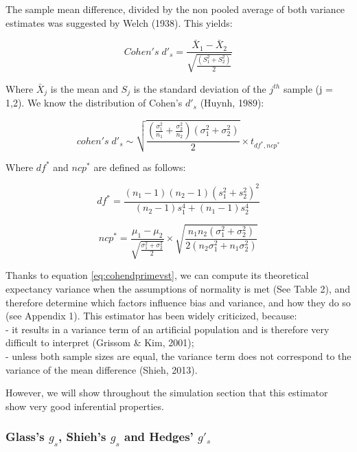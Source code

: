 \documentclass[
  man,floatsintext]{apa6}
\begin{document}
The sample mean difference, divided by the non pooled average of both variance estimates was suggested by Welch (1938). This yields:

\begin{equation} 
Cohen's \; d'_s = \frac{\bar{X}_{1} - \bar{X}_{2}}{ \sqrt{\frac{\left(S^2_{1}+S^2_{2} \right)}{2}}}
\label{eq:cohenprimeds}
\end{equation}

Where \(\bar{X}_{j}\) is the mean and \(S_j\) is the standard deviation of the \(j^{th}\) sample (j = 1,2). We know the distribution of Cohen's \(d'_{s}\) (Huynh, 1989):

\begin{equation} 
cohen's \; d'_s \sim  \sqrt{\frac{\left( \frac{\sigma^2_1}{n_1}+\frac{\sigma^2_2}{n_2}\right)(\sigma^2_1+\sigma^2_2)}{2}} \times t_{df^*,ncp^*}
\label{eq:cohendprimedist}
\end{equation}

Where \(df^*\) and \(ncp^*\) are defined as follows:

\begin{equation} 
df^* = \frac{(n_1-1)(n_2-1)(s^2_1+s^2_2)^2}{(n_2-1)s^4_1+(n_1-1)s^4_2}
\label{eq:cohendprimedf}
\end{equation}

\begin{equation} 
ncp^*=\frac{\mu_1-\mu_2}{\sqrt{\frac{\sigma^2_1+\sigma^2_2}{2}}} \times \sqrt{\frac{n_1n_2(\sigma^2_1+\sigma^2_2)}{2(n_2\sigma^2_1+n_1\sigma^2_2)}}
\label{eq:cohendprimevst}
\end{equation}

Thanks to equation \ref{eq:cohendprimevst}, we can compute its theoretical expectancy variance when the assumptions of normality is met (See Table 2), and therefore determine which factors influence bias and variance, and how they do so (see Appendix 1). This estimator has been widely criticized, because:\\
- it results in a variance term of an artificial population and is therefore very difficult to interpret (Grissom \& Kim, 2001);\\
- unless both sample sizes are equal, the variance term does not correspond to the variance of the mean difference (Shieh, 2013).

However, we will show throughout the simulation section that this estimator show very good inferential properties.

\hypertarget{glasss-g_s-shiehs-g_s-and-hedges-g_s}{%
\subsubsection{\texorpdfstring{Glass's \(g_s\), Shieh's \(g_s\) and Hedges' \(g'_s\)}{Glass's g\_s, Shieh's g\_s and Hedges' g'\_s}}\label{glasss-g_s-shiehs-g_s-and-hedges-g_s}}
\end{document}
